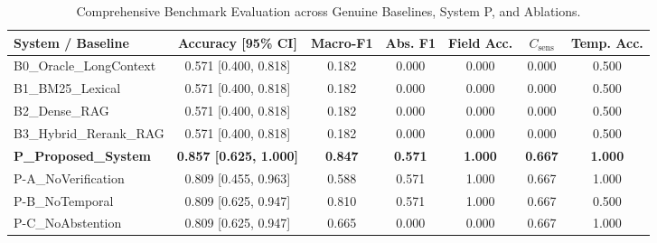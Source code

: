 \begin{table}[t]
\centering
\small
\caption{Comprehensive Benchmark Evaluation across Genuine Baselines, System P, and Ablations.}
\label{tab:evaluation_results}
\begin{tabular}{lcccccc}
\toprule
\textbf{System / Baseline} & \textbf{Accuracy [95\% CI]} & \textbf{Macro-F1} & \textbf{Abs. F1} & \textbf{Field Acc.} & \textbf{$C_{\text{sens}}$} & \textbf{Temp. Acc.} \\
\midrule
B0\_Oracle\_LongContext & 0.571 [0.400, 0.818] & 0.182 & 0.000 & 0.000 & 0.000 & 0.500 \\
B1\_BM25\_Lexical & 0.571 [0.400, 0.818] & 0.182 & 0.000 & 0.000 & 0.000 & 0.500 \\
B2\_Dense\_RAG & 0.571 [0.400, 0.818] & 0.182 & 0.000 & 0.000 & 0.000 & 0.500 \\
B3\_Hybrid\_Rerank\_RAG & 0.571 [0.400, 0.818] & 0.182 & 0.000 & 0.000 & 0.000 & 0.500 \\
\textbf{P\_Proposed\_System} & \textbf{0.857 [0.625, 1.000]} & \textbf{0.847} & \textbf{0.571} & \textbf{1.000} & \textbf{0.667} & \textbf{1.000} \\
P-A\_NoVerification & 0.809 [0.455, 0.963] & 0.588 & 0.571 & 1.000 & 0.667 & 1.000 \\
P-B\_NoTemporal & 0.809 [0.625, 0.947] & 0.810 & 0.571 & 1.000 & 0.667 & 0.500 \\
P-C\_NoAbstention & 0.809 [0.625, 0.947] & 0.665 & 0.000 & 0.000 & 0.667 & 1.000 \\
\bottomrule
\end{tabular}
\end{table}